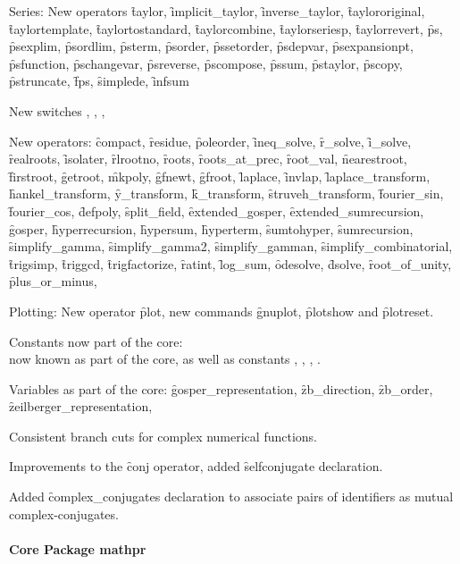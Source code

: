 Series: New operators
\f{taylor}, \f{implicit\_taylor}, \f{inverse\_taylor},
\f{taylororiginal}, \f{taylortemplate}, \f{taylortostandard}, \f{taylorcombine}, \f{taylorseriesp},
\f{taylorrevert},
\f{ps}, 
\f{psexplim}, \f{psordlim}, \f{psterm}, \f{psorder}, \f{pssetorder}, \f{psdepvar}, \f{psexpansionpt},
\f{psfunction}, \f{pschangevar}, \f{psreverse}, \f{pscompose}, \f{pssum}, \f{pstaylor}, \f{pscopy}, \f{pstruncate},
\f{fps}, \f{simplede}, \f{infsum}

New switches , , , 

New operators:
\f{compact},
\f{residue}, \f{poleorder},
\f{ineq\_solve}, \f{r\_solve}, \f{i\_solve},
\f{realroots}, \f{isolater}, \f{rlrootno}, 
\f{roots}, \f{roots\_at\_prec}, \f{root\_val}, \f{nearestroot}, \f{firstroot},
\f{getroot}, \f{mkpoly}, \f{gfnewt}, \f{gfroot},
\f{laplace}, \f{invlap},
\f{laplace\_transform}, \f{hankel\_transform}, \f{y\_transform}, \f{k\_transform}, \f{struveh\_transform},
\f{fourier\_sin}, \f{fourier\_cos},
\f{defpoly}, \f{split\_field},
\f{extended\_gosper}, \f{extended\_sumrecursion},
\f{gosper}, \f{hyperrecursion}, \f{hypersum}, \f{hyperterm},
\f{sumtohyper}, \f{sumrecursion},
\f{simplify\_gamma}, \f{simplify\_gamma2}, \f{simplify\_gamman}, \f{simplify\_combinatorial},
\f{trigsimp}, \f{triggcd}, \f{trigfactorize},
\f{ratint}, \f{log\_sum},
\f{odesolve}, \f{dsolve}, \f{root\_of\_unity}, \f{plus\_or\_minus},

Plotting: New operator \f{plot}, new commands \f{gnuplot}, \f{plotshow} and \f{plotreset}.

Constants now part of the core:\\
 now known as part of the
core, as well as constants , , ,
.

Variables as part of the core: \f{gosper\_representation},
\f{zb\_direction}, \f{zb\_order}, \f{zeilberger\_representation},


Consistent branch cuts for complex numerical functions.

Improvements to the \f{conj} operator, added \f{selfconjugate} declaration.

Added \f{complex\_conjugates} declaration to associate pairs of identifiers
as mutual complex-conjugates.

\paragraph*{Core Package mathpr}

